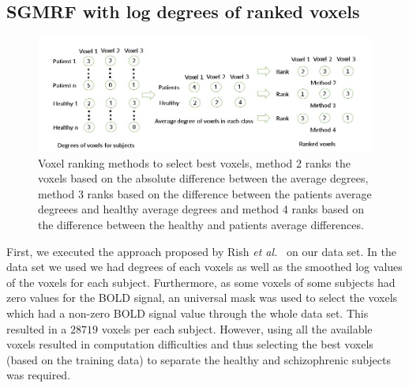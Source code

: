 \documentclass{article} %
\begin{document}
\subsection{SGMRF with log degrees of ranked voxels}
\begin{figure}\label{fig:voxel_rank}
\includegraphics[width=\textwidth]{Voxel_ranking.jpg}
\caption{Voxel ranking methods to select best voxels, method 2 ranks the voxels 
based on the absolute difference between the average degrees, method 3 ranks 
based on the difference between the patients average degreees and healthy 
average degrees and method 4 ranks based on the difference between the healthy 
and patients average differences.}
\end{figure}
First, we executed the approach proposed by Rish \emph{et al.}~\cite{Rish_2013} 
on our data set. In the data set we used we had degrees of each voxels as well 
as the smoothed log values of the voxels for each subject. Furthermore, as 
some voxels of some subjects had zero values for the BOLD signal, an universal 
mask was used to select the voxels which had a non-zero BOLD signal value 
through the whole data set. This resulted in a $28719$ voxels per each subject. 
However, using all the available voxels resulted in computation difficulties 
and thus selecting the best voxels (based on the training data) to separate 
the healthy and schizophrenic subjects was required. 
\end{document}
